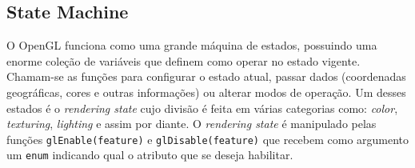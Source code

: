 \documentclass[12pt, 
openright, 
oneside, 
a4paper,    
brazil]{facom-ufu-abntex2}
\begin{document}
\subsection{State Machine}
O OpenGL funciona como uma grande máquina de estados, possuindo uma enorme coleção de variáveis que definem como  operar no estado vigente. Chamam-se as funções para configurar o estado atual, passar dados (coordenadas geográficas, cores e outras informações) ou alterar modos de operação. Um desses estados é o \textit{rendering state} cujo divisão é feita em várias categorias como: \textit{color}, \textit{texturing}, \textit{lighting} e assim por diante. O \textit{rendering state} é manipulado pelas funções \texttt{glEnable(feature)} e \texttt{glDisable(feature)} que recebem como argumento um \texttt{enum} indicando qual o atributo que se deseja habilitar.
\end{document}
